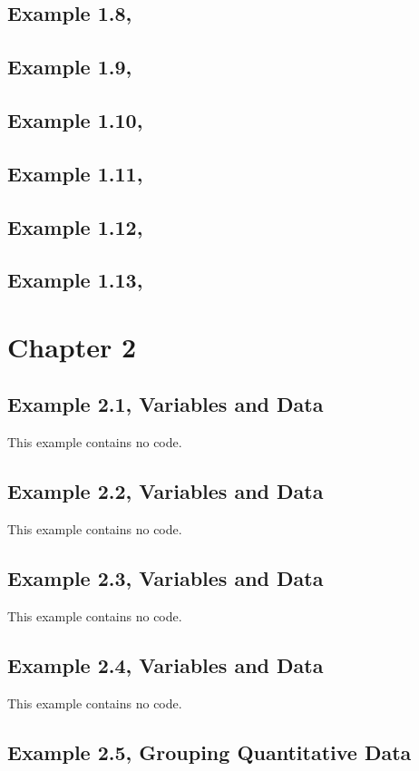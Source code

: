 \documentclass{article}\usepackage[]{graphicx}\usepackage[]{color}
\begin{document}
\subsection{Example 1.8, }
\subsection{Example 1.9, }
\subsection{Example 1.10, }
\subsection{Example 1.11, }
\subsection{Example 1.12, }
\subsection{Example 1.13, }


\section{Chapter 2}

\subsection{Example 2.1, Variables and Data}This example contains no code.
\subsection{Example 2.2, Variables and Data}This example contains no code.
\subsection{Example 2.3, Variables and Data}This example contains no code.
\subsection{Example 2.4, Variables and Data}This example contains no code.
\subsection{Example 2.5, Grouping Quantitative Data}
\end{document}
